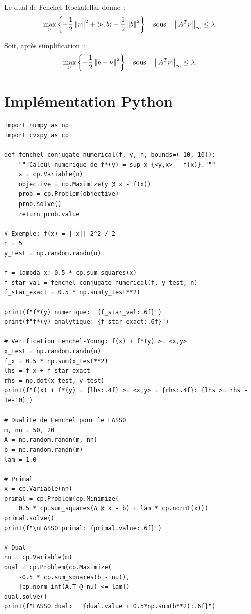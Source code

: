 Le dual de Fenchel--Rockafellar donne~:
\[
    \max_\nu \left\{-\frac{1}{2}\left\| \nu \right\|^2 + \langle \nu, b \rangle - \frac{1}{2}\left\| b \right\|^2\right\}
    \quad \text{sous} \quad \left\| A^T\nu \right\|_\infty \leq \lambda.
\]

Soit, apr\`es simplification~:
\[
    \max_\nu \left\{-\frac{1}{2}\left\| b - \nu \right\|^2\right\}
    \quad \text{sous} \quad \left\| A^T\nu \right\|_\infty \leq \lambda.
\]

\section{Impl\'ementation Python}

\begin{codeblock}[title=\textbf{Calcul de conjugu\'ees et v\'erification de Fenchel--Young}]
\begin{verbatim}
import numpy as np
import cvxpy as cp

def fenchel_conjugate_numerical(f, y, n, bounds=(-10, 10)):
    """Calcul numerique de f*(y) = sup_x {<y,x> - f(x)}."""
    x = cp.Variable(n)
    objective = cp.Maximize(y @ x - f(x))
    prob = cp.Problem(objective)
    prob.solve()
    return prob.value

# Exemple: f(x) = ||x||_2^2 / 2
n = 5
y_test = np.random.randn(n)

f = lambda x: 0.5 * cp.sum_squares(x)
f_star_val = fenchel_conjugate_numerical(f, y_test, n)
f_star_exact = 0.5 * np.sum(y_test**2)

print(f"f*(y) numerique:  {f_star_val:.6f}")
print(f"f*(y) analytique: {f_star_exact:.6f}")

# Verification Fenchel-Young: f(x) + f*(y) >= <x,y>
x_test = np.random.randn(n)
f_x = 0.5 * np.sum(x_test**2)
lhs = f_x + f_star_exact
rhs = np.dot(x_test, y_test)
print(f"f(x) + f*(y) = {lhs:.4f} >= <x,y> = {rhs:.4f}: {lhs >= rhs - 1e-10}")

# Dualite de Fenchel pour le LASSO
m, nn = 50, 20
A = np.random.randn(m, nn)
b = np.random.randn(m)
lam = 1.0

# Primal
x = cp.Variable(nn)
primal = cp.Problem(cp.Minimize(
    0.5 * cp.sum_squares(A @ x - b) + lam * cp.norm1(x)))
primal.solve()
print(f"\nLASSO primal: {primal.value:.6f}")

# Dual
nu = cp.Variable(m)
dual = cp.Problem(cp.Maximize(
    -0.5 * cp.sum_squares(b - nu)),
    [cp.norm_inf(A.T @ nu) <= lam])
dual.solve()
print(f"LASSO dual:   {dual.value + 0.5*np.sum(b**2):.6f}")
\end{verbatim}
\end{codeblock}

